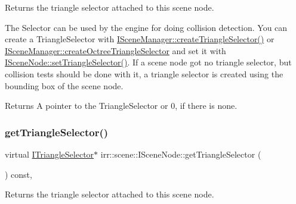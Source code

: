 Returns the triangle selector attached to this scene node. 

The Selector can be used by the engine for doing collision detection. You can create a Triangle\+Selector with \hyperlink{classirr_1_1scene_1_1ISceneManager_a266625379b1558e9be1dc062ea4e71f7}{I\+Scene\+Manager\+::create\+Triangle\+Selector()} or \hyperlink{classirr_1_1scene_1_1ISceneManager_a4ed7d3b34f4d0c70395b6d464fe32b96}{I\+Scene\+Manager\+::create\+Octree\+Triangle\+Selector} and set it with \hyperlink{classirr_1_1scene_1_1ISceneNode_a87fb52ec54bf3ae117340d8defd1255f}{I\+Scene\+Node\+::set\+Triangle\+Selector()}. If a scene node got no triangle selector, but collision tests should be done with it, a triangle selector is created using the bounding box of the scene node. \begin{DoxyReturn}{Returns}
A pointer to the Triangle\+Selector or 0, if there is none. 
\end{DoxyReturn}
\mbox{\label{classirr_1_1scene_1_1ISceneNode_ab820f7ccfdd317d3913316b6991ea5d9}} 
\subsubsection{\texorpdfstring{get\+Triangle\+Selector()}{getTriangleSelector()}\hspace{0.1cm}{\footnotesize\ttfamily [2/2]}}
{\footnotesize\ttfamily virtual \hyperlink{classirr_1_1scene_1_1ITriangleSelector}{I\+Triangle\+Selector}$\ast$ irr\+::scene\+::\+I\+Scene\+Node\+::get\+Triangle\+Selector (\begin{DoxyParamCaption}{ }\end{DoxyParamCaption}) const\hspace{0.3cm}{\ttfamily [inline]}, {\ttfamily [virtual]}}



Returns the triangle selector attached to this scene node. 

